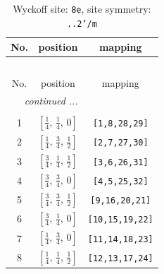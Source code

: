 \documentclass[fleqn,8pt]{jsarticle}
\begin{document}
\renewcommand{\arraystretch}{1.2}
\begin{longtable}{ccc}
\caption{Wyckoff site: {\tt 8e}, site symmetry: {\tt ..2'/m}}
 \\
 \hline \hline
No. & position & mapping \\ \hline \endfirsthead

\multicolumn{2}{l}{\tablename\ \thetable{}} \\
 \hline \hline
No. & position & mapping \\ \hline \endhead

 \hline \hline
\multicolumn{2}{r}{\footnotesize\it continued ...} \\ \endfoot

 \hline \hline
\multicolumn{2}{r}{} \\ \endlastfoot

1 & $\left[ \frac{1}{4},\, \frac{1}{4},\, 0 \right]$ & {\tt [1,8,28,29]} \\ \hline
2 & $\left[ \frac{1}{4},\, \frac{3}{4},\, \frac{1}{2} \right]$ & {\tt [2,7,27,30]} \\ \hline
3 & $\left[ \frac{3}{4},\, \frac{1}{4},\, \frac{1}{2} \right]$ & {\tt [3,6,26,31]} \\ \hline
4 & $\left[ \frac{3}{4},\, \frac{3}{4},\, 0 \right]$ & {\tt [4,5,25,32]} \\ \hline
5 & $\left[ \frac{3}{4},\, \frac{3}{4},\, \frac{1}{2} \right]$ & {\tt [9,16,20,21]} \\ \hline
6 & $\left[ \frac{3}{4},\, \frac{1}{4},\, 0 \right]$ & {\tt [10,15,19,22]} \\ \hline
7 & $\left[ \frac{1}{4},\, \frac{3}{4},\, 0 \right]$ & {\tt [11,14,18,23]} \\ \hline
8 & $\left[ \frac{1}{4},\, \frac{1}{4},\, \frac{1}{2} \right]$ & {\tt [12,13,17,24]} \\
\end{longtable}
\renewcommand{\arraystretch}{1.2}
\end{document}
